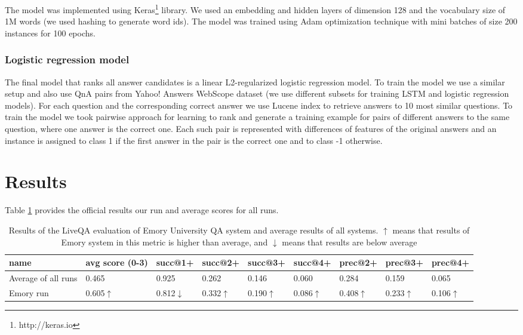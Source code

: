 \documentclass[]{article}
\begin{document}
The model was implemented using Keras\footnote{http://keras.io} library.
We used an embedding and hidden layers of dimension 128 and the vocabulary size of 1M words (we used hashing to generate word ids).
The model was trained using Adam optimization technique \cite{kingma2014adam} with mini batches of size 200 instances for 100 epochs.

\subsubsection{Logistic regression model}

The final model that ranks all answer candidates is a linear L2-regularized logistic regression model.
To train the model we use a similar setup and also use QnA pairs from Yahoo! Answers WebScope dataset (we use different subsets for training LSTM and logistic regression models). 
For each question and the corresponding correct answer we use Lucene index to retrieve answers to 10 most similar questions.
To train the model we took pairwise approach for learning to rank and generate a training example for pairs of different answers to the same question, where one answer is the correct one.
Each such pair is represented with differences of features of the original answers and an instance is assigned to class 1 if the first answer in the pair is the correct one and to class -1 otherwise.

\section{Results}

Table \ref{table:liveqa-results} provides the official results our run and average scores for all runs.

\begin{table}
\caption{Results of the LiveQA evaluation of Emory University QA system and average results of all systems. $\uparrow$ means that results of Emory system in this metric is higher than average, and $\downarrow$ means that results are below average}
\label{table:liveqa-results}
\begin{tabular}{|p{2cm}|p{1.4cm}|p{1.3cm}|p{1.3cm}|p{1.3cm}|p{1.3cm}|p{1.3cm}|p{1.3cm}|p{1.3cm}|}
\hline
name & avg score (0-3) & succ@1+ & succ@2+ & succ@3+ & succ@4+ & prec@2+ &
 prec@3+ & prec@4+ \\
\hline
Average of all runs & 0.465 & 0.925 & 0.262 & 0.146 & 0.060 & 0.284 & 0.159 & 0.065\\
 \hline
Emory run & 0.605$\uparrow$ & 0.812$\downarrow$ & 0.332$\uparrow$ & 0.190$\uparrow$ & 0.086$\uparrow$ & 0.408$\uparrow$ & 0.233$\uparrow$ & 0.106$\uparrow$\\
\hline
\end{tabular}
\end{table}
\end{document}
